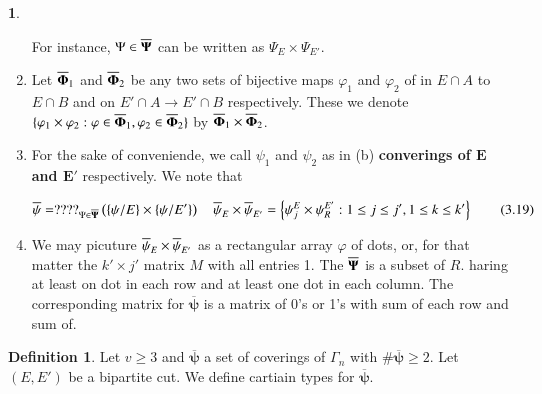 \documentclass[a4paper,12pt]{article}
\theoremstyle{definition}
\theoremstyle{underlinethm}
\newtheorem{definition}{Definition}[section]
\theoremstyle{definition}
\newtheorem{subsubsec}{}[subsection]
\begin{document}
\begin{subsubsec}
\begin{enumerate}[label=(\alph*)]
For instance, $\Psi \in \overline{\bold{\Psi}}$ can be written as $\Psi_{E} \times \Psi_{E'}$.

\item Let $\overline{\bold\Phi}_{1}$ and $\overline{\bold{\Phi}}_{2}$ be any two sets of bijective maps $\varphi_{1}$ and $\varphi_{2}$ of in $E \cap A$ to $E \cap B$ and on $E' \cap A \rightarrow E' \cap B$  respectively. These we denote $\{ \varphi_{1} \times \varphi_{2} : \varphi \in \overline{\bold\Phi}_{1}, \varphi_{2} \in \overline{\bold\Phi}_{2}\}$ by $\overline{\bold\Phi}_{1} \times \overline{\bold\Phi}_{2}$.

\item For the sake of conveniende, we call $\psi_{1}$ and $\psi_{2}$ as in (b) \textbf{converings of $\mathbf{E}$ and $\mathbf{E'}$} respectively. We note 
that

 \begin{equation}
 \overline{\bold{\psi}}=????_{\Psi \in \overline{\bold\Psi}} \left(\{\psi/E\} \times \{\psi/E' \} \right) \quad \overline{\bold\psi}_{E} \times \overline{\bold\psi}_{E'} = \left\{\psi_{j}^{E} \times \psi_{R}^{E'} : 1 \leq j \leq j', 1 \leq k \leq k'\right\}\tag{3.19}\label{eq-3.19}
\end{equation}


\item We may picuture $\overline{\bold\psi}_{E} \times \overline{\bold\psi}_{E'}$ as a rectangular array $\varphi$ of dots, or, for that matter the $k' \times j'$ matrix $M$ with all entries 1. The $\overline{\bold\Psi}$ is a subset of $R$. haring at least on dot in each row and at least one dot in each column. The corresponding matrix for $\overline{\boldsymbol{\psi}}$ is a matrix of 0's or 1's with sum of each row and sum of. 
\end{enumerate}
\end{subsubsec}

\begin{definition}\label{definition-3.2}
Let $v \geq 3$ and $\overline{\boldsymbol{\psi}}$ a set of coverings of $\Gamma_{n}$ with $\# \overline{\boldsymbol{\psi}} \geq 2$. Let $(E, E')$ be a bipartite cut. We define cartiain types for $\overline{\boldsymbol{\psi}}$. 
\end{definition}
\end{document}
